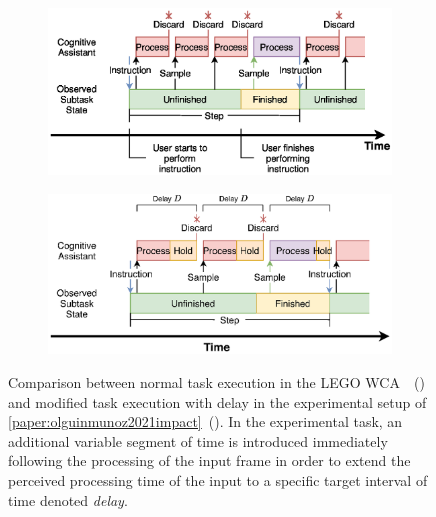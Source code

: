 \begin{figure}[tb]
    \centering
    \begin{subfigure}[t]{.49\textwidth}
        \centering
        \includegraphics[width=\textwidth]{publications/2021ImpactDelayedResponse/Fig4a}
        \caption{}\label{sfig:regularwcaexec}
    \end{subfigure}%
    \hfill%
    \begin{subfigure}[t]{.49\textwidth}
        \centering
        \includegraphics[width=\textwidth]{publications/2021ImpactDelayedResponse/Fig4b}
        \caption{}\label{sfig:delaywcaexec}
    \end{subfigure}
    \caption{%
        Comparison between normal task execution in the LEGO \gls{WCA}~\cite{chen2015early}~() and modified task execution with delay in the experimental setup of \cref{paper:olguinmunoz2021impact}~().
        In the experimental task, an additional variable segment of time is introduced immediately following the processing of the input frame in order to extend the perceived processing time of the input to a specific target interval of time denoted \emph{delay}.
    }\label{fig:regularwca-vs-delaywca}
\end{figure}

